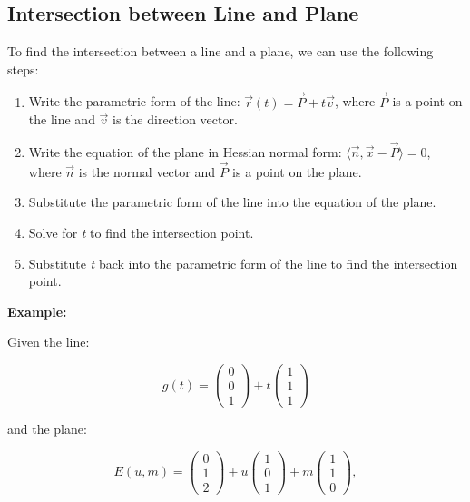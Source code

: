 \subsection{Intersection between Line and Plane}

To find the intersection between a line and a plane, we can use the following steps:

\begin{enumerate}
	\item Write the parametric form of the line: \(\vec{r}(t) = \vec{P} + t\vec{v}\), where \(\vec{P}\) is a point on the line and \(\vec{v}\) is the direction vector.
	\item Write the equation of the plane in Hessian normal form: \(\langle \vec{n}, \vec{x} - \vec{P} \rangle = 0\), where \(\vec{n}\) is the normal vector and \(\vec{P}\) is a point on the plane.
	\item Substitute the parametric form of the line into the equation of the plane.
	\item Solve for \emph{t} to find the intersection point.
	\item Substitute \emph{t} back into the parametric form of the line to find the intersection point.
\end{enumerate}

\textbf{Example:}
\vspace{\baselineskip}

Given the line:

\[
	g(t) = \begin{pmatrix} 0 \\ 0 \\ 1 \end{pmatrix} + t \begin{pmatrix} 1 \\ 1 \\ 1 \end{pmatrix}
\]

and the plane:

\[
	E(u, m) = \begin{pmatrix} 0 \\ 1 \\ 2 \end{pmatrix} + u \begin{pmatrix} 1 \\ 0 \\ 1 \end{pmatrix} + m \begin{pmatrix} 1 \\ 1 \\ 0 \end{pmatrix},
\]

